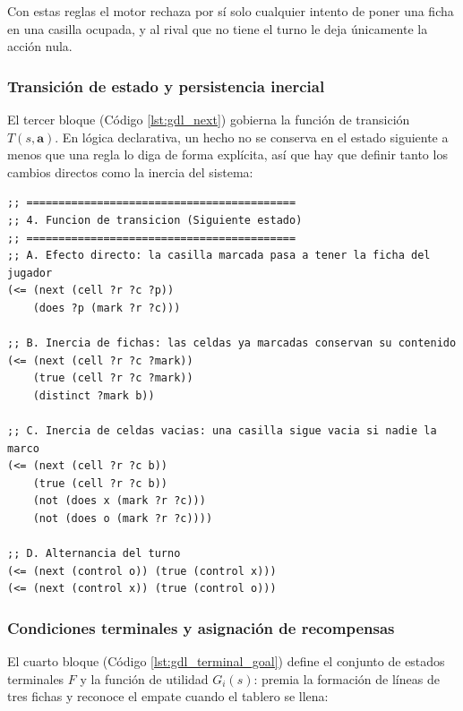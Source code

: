 Con estas reglas el motor rechaza por sí solo cualquier intento de poner una ficha en una casilla ocupada, y al rival que no tiene el turno le deja únicamente la acción nula.

\subsubsection{Transición de estado y persistencia inercial}

El tercer bloque (Código \ref{lst:gdl_next}) gobierna la función de transición $T(s, \mathbf{a})$. En lógica declarativa, un hecho no se conserva en el estado siguiente a menos que una regla lo diga de forma explícita, así que hay que definir tanto los cambios directos como la inercia del sistema:

\begin{lstlisting}[float=htbp,caption={Reglas de transición dinámica e inercia en GDL.},label={lst:gdl_next}]
;; ==========================================
;; 4. Funcion de transicion (Siguiente estado)
;; ==========================================
;; A. Efecto directo: la casilla marcada pasa a tener la ficha del jugador
(<= (next (cell ?r ?c ?p))
    (does ?p (mark ?r ?c)))

;; B. Inercia de fichas: las celdas ya marcadas conservan su contenido
(<= (next (cell ?r ?c ?mark))
    (true (cell ?r ?c ?mark))
    (distinct ?mark b))

;; C. Inercia de celdas vacias: una casilla sigue vacia si nadie la marco
(<= (next (cell ?r ?c b))
    (true (cell ?r ?c b))
    (not (does x (mark ?r ?c)))
    (not (does o (mark ?r ?c))))

;; D. Alternancia del turno
(<= (next (control o)) (true (control x)))
(<= (next (control x)) (true (control o)))
\end{lstlisting}

\subsubsection{Condiciones terminales y asignación de recompensas}

El cuarto bloque (Código \ref{lst:gdl_terminal_goal}) define el conjunto de estados terminales $F$ y la función de utilidad $G_i(s)$: premia la formación de líneas de tres fichas y reconoce el empate cuando el tablero se llena:

